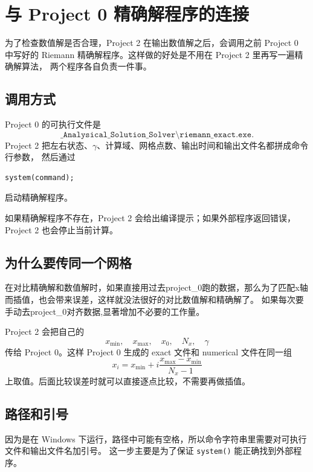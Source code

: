 \section{与 Project 0 精确解程序的连接}

为了检查数值解是否合理，Project 2 在输出数值解之后，会调用之前 Project 0 中写好的
Riemann 精确解程序。这样做的好处是不用在 Project 2 里再写一遍精确解算法，
两个程序各自负责一件事。

\subsection{调用方式}

Project 0 的可执行文件是
\[
\texttt{\_Analysical\_Solution\_Solver\textbackslash riemann\_exact.exe}.
\]
Project 2 把左右状态、\(\gamma\)、计算域、网格点数、输出时间和输出文件名都拼成命令行参数，
然后通过
\begin{lstlisting}
system(command);
\end{lstlisting}
启动精确解程序。

如果精确解程序不存在，Project 2 会给出编译提示；如果外部程序返回错误，
Project 2 也会停止当前计算。

\subsection{为什么要传同一个网格}

在对比精确解和数值解时，如果直接用过去project\_0跑的数据，那么为了匹配x轴而插值，也会带来误差，这样就没法很好的对比数值解和精确解了。
如果每次要手动去project\_0对齐数据,显著增加不必要的工作量。

Project 2 会把自己的
\[
x_{\min},\quad x_{\max},\quad x_0,\quad N_x,\quad \gamma
\]
传给 Project 0。这样 Project 0 生成的 exact 文件和 numerical 文件在同一组
\[
x_i=x_{\min}+i\frac{x_{\max}-x_{\min}}{N_x-1}
\]
上取值。后面比较误差时就可以直接逐点比较，不需要再做插值。


\subsection{路径和引号}

因为是在 Windows 下运行，路径中可能有空格，所以命令字符串里需要对可执行文件和输出文件名加引号。
这一步主要是为了保证 \texttt{system()} 能正确找到外部程序。
